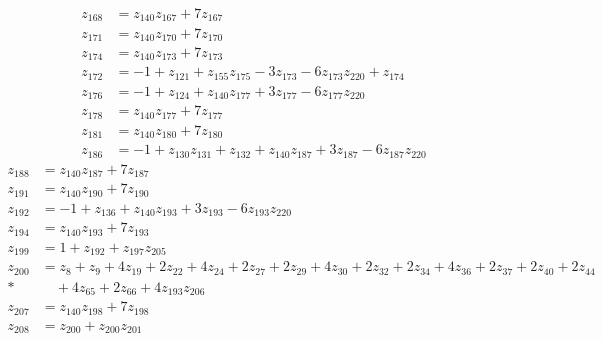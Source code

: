 \documentclass[11pt]{article}
\theoremstyle{remark}
\begin{document}
\begin{align*}
z_{168}&=z_{140} z_{167}+7z_{167}\\[3pt]
z_{171}&=z_{140} z_{170}+7z_{170}\\[3pt]
z_{174}&=z_{140} z_{173}+7z_{173}\\[3pt]
z_{172}&=-1+z_{121}+z_{155} z_{175}-3z_{173}-6z_{173} z_{220}+z_{174}\\[3pt]
z_{176}&=-1+z_{124}+z_{140} z_{177}+3z_{177}-6z_{177} z_{220}\\[3pt]
z_{178}&=z_{140} z_{177}+7z_{177}\\[3pt]
z_{181}&=z_{140} z_{180}+7z_{180}\\[3pt]
z_{186}&=-1+z_{130} z_{131}+z_{132}+z_{140} z_{187}+3z_{187}-6z_{187} z_{220}
\end{align*}
\begin{align*}
z_{188}&=z_{140} z_{187}+7z_{187}\\[3pt]
z_{191}&=z_{140} z_{190}+7z_{190}\\[3pt]
z_{192}&=-1+z_{136}+z_{140} z_{193}+3z_{193}-6z_{193} z_{220}\\[3pt]
z_{194}&=z_{140} z_{193}+7z_{193}\\[3pt]
z_{199}&=1+z_{192}+z_{197} z_{205}\\[3pt]
z_{200}&=z_{8}+z_{9}+4z_{19}+2z_{22}+4z_{24}+2z_{27}+2z_{29}+4z_{30}+2z_{32}+2z_{34}+4z_{36}+2z_{37}+2z_{40}+2z_{44}\\*
&\quad{}+4z_{65}+2z_{66}+4z_{193} z_{206}\\[3pt]
z_{207}&=z_{140} z_{198}+7z_{198}\\[3pt]
z_{208}&=z_{200}+z_{200} z_{201}
\end{align*}
\end{document}
